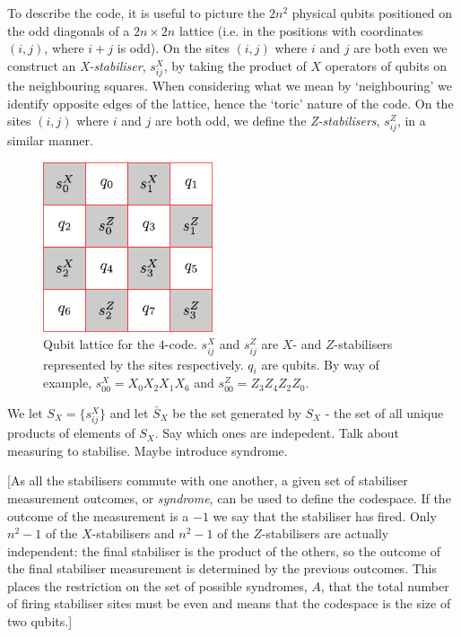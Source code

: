 To describe the code, it is useful to picture the $2n^2$ physical qubits positioned on the odd diagonals of a $2n \times 2n$ lattice (i.e. in the positions with coordinates $(i,j)$, where $i+j$ is odd). On the sites $(i, j)$ where $i$ and $j$ are both even we construct an \textit{X-stabiliser}, $s^X_{ij}$, by taking the product of $X$ operators of qubits on the neighbouring squares. When considering what we mean by `neighbouring' we identify opposite edges of the lattice, hence the `toric' nature of the code. On the sites $(i,j)$ where $i$ and $j$ are both odd, we define the \textit{Z-stabilisers}, $s^Z_{ij}$, in a similar manner.
\begin{figure}[htb]
  \begin{center}
    \includegraphics[width=5cm]{assets/4-code.pdf}
  \end{center}
  \caption{Qubit lattice for the $4$-code. $s_{ij}^X$ and $s_{ij}^Z$ are $X$- and $Z$-stabilisers represented by the sites respectively. $q_i$ are qubits. By way of example, $s_{00}^X = X_0 X_2 X_1 X_6$ and $s_{00}^Z = Z_3 Z_4 Z_2 Z_0$.}
  \label{4-code}
\end{figure}

We let $S_X = \{s^X_{ij}\}$ and let $\bar{S}_X$ be the set generated by $S_X$ - the set of all unique products of elements of $S_X$. 
Say which ones are indepedent. Talk about measuring to stabilise. Maybe introduce syndrome.

[As all the stabilisers commute with one another, a given set of stabiliser measurement outcomes, or {\it syndrome}, can be used to define the codespace. If the outcome of the measurement is a $-1$ we say that the stabiliser has fired. Only $n^2-1$ of the $X$-stabilisers and $n^2-1$ of the $Z$-stabilisers are actually independent: the final stabiliser is the product of the others, so the outcome of the final stabiliser measurement is determined by the previous outcomes. This places the restriction on the set of possible syndromes, $A$, that the total number of firing stabiliser sites must be even and means that the codespace is the size of two qubits.]


